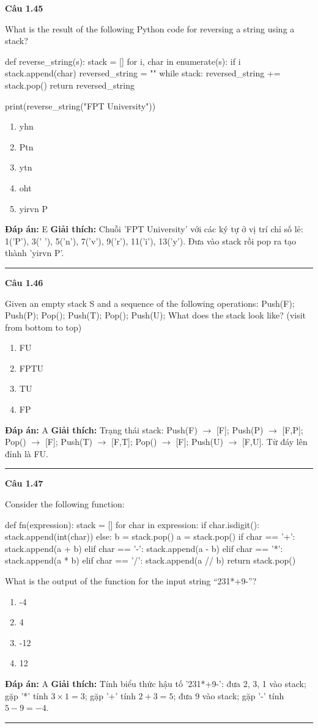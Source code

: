 \documentclass[11pt,a4paper]{article}
\newenvironment{question}[1]{%
  \par\vspace{1em}\noindent\textbf{\large Câu #1}\par\vspace{0.4em}
}{%
  \par\vspace{1em}\hrule\vspace{0.6em}
}
\newenvironment{choices}{%
  \begin{enumerate}[label=\textbf{\Alph*.},leftmargin=2.2em,itemsep=2pt,topsep=3pt]
}{%
  \end{enumerate}
}
\newcommand{\choice}{\item}
\newenvironment{codebox}{%
  \begin{tcolorbox}[colback=gray!8!white,colframe=gray!50!black,arc=1.5mm,boxrule=0.6pt,left=3mm,right=3mm,top=2.5mm,bottom=2.5mm]
  \ttfamily\small
}{%
  \end{tcolorbox}
}
\begin{document}
\begin{question}{1.45}
What is the result of the following Python code for reversing a string using a stack?
\begin{codebox}
def reverse_string(s):
    stack = []
    for i, char in enumerate(s):
        if i %
            stack.append(char)
    reversed_string = ""
    while stack:
        reversed_string += stack.pop()
    return reversed_string

print(reverse_string("FPT University"))
\end{codebox}
\begin{choices}
\choice yhn
\choice Ptn
\choice ytn
\choice oht
\choice yirvn P
\end{choices}
\textbf{Đáp án:} E
\textbf{Giải thích:} Chuỗi 'FPT University' với các ký tự ở vị trí chỉ số lẻ: 1('P'), 3(' '), 5('n'), 7('v'), 9('r'), 11('i'), 13('y'). Đưa vào stack rồi pop ra tạo thành 'yirvn P'.
\end{question}

\begin{question}{1.46}
Given an empty stack S and a sequence of the following operations: Push(F); Push(P); Pop(); Push(T); Pop(); Push(U); What does the stack look like? (visit from bottom to top)
\begin{choices}
\choice FU
\choice FPTU
\choice TU
\choice FP
\end{choices}
\textbf{Đáp án:} A
\textbf{Giải thích:} Trạng thái stack: Push(F) $\to$ [F]; Push(P) $\to$ [F,P]; Pop() $\to$ [F]; Push(T) $\to$ [F,T]; Pop() $\to$ [F]; Push(U) $\to$ [F,U]. Từ đáy lên đỉnh là FU.
\end{question}

\begin{question}{1.47}
Consider the following function:
\begin{codebox}
def fn(expression):
    stack = []
    for char in expression:
        if char.isdigit():
            stack.append(int(char))
        else:
            b = stack.pop()
            a = stack.pop()
            if char == '+':
                stack.append(a + b)
            elif char == '-':
                stack.append(a - b)
            elif char == '*':
                stack.append(a * b)
            elif char == '/':
                stack.append(a // b)
    return stack.pop()
\end{codebox}
What is the output of the function for the input string ``231*+9-''?
\begin{choices}
\choice -4
\choice 4
\choice -12
\choice 12
\end{choices}
\textbf{Đáp án:} A
\textbf{Giải thích:} Tính biểu thức hậu tố '231*+9-': đưa 2, 3, 1 vào stack; gặp '*' tính $3 \times 1 = 3$; gặp '+' tính $2 + 3 = 5$; đưa 9 vào stack; gặp '-' tính $5 - 9 = -4$.
\end{question}
\end{document}
